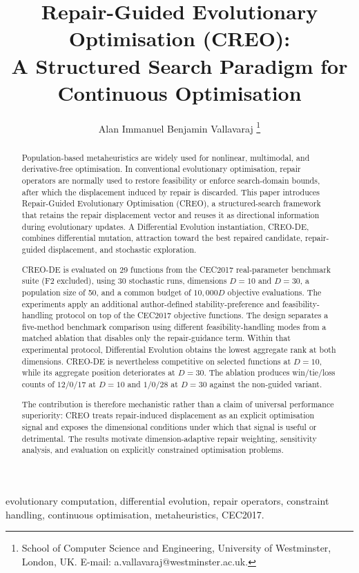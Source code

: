 \documentclass[journal]{IEEEtran}
\title{Repair-Guided Evolutionary Optimisation (CREO):\\
A Structured Search Paradigm for Continuous Optimisation}
\author{Alan Immanuel Benjamin Vallavaraj%
\thanks{School of Computer Science and Engineering, University of Westminster, London, UK.
E-mail: a.vallavaraj@westminster.ac.uk.}}
\begin{document}
\maketitle

\begin{abstract}
Population-based metaheuristics are widely used for nonlinear, multimodal, and derivative-free optimisation. In conventional evolutionary optimisation, repair operators are normally used to restore feasibility or enforce search-domain bounds, after which the displacement induced by repair is discarded. This paper introduces Repair-Guided Evolutionary Optimisation (CREO), a structured-search framework that retains the repair displacement vector and reuses it as directional information during evolutionary updates. A Differential Evolution instantiation, CREO-DE, combines differential mutation, attraction toward the best repaired candidate, repair-guided displacement, and stochastic exploration.

CREO-DE is evaluated on 29 functions from the CEC2017 real-parameter benchmark suite (F2 excluded), using 30 stochastic runs, dimensions $D=10$ and $D=30$, a population size of 50, and a common budget of $10{,}000D$ objective evaluations. The experiments apply an additional author-defined stability-preference and feasibility-handling protocol on top of the CEC2017 objective functions. The design separates a five-method benchmark comparison using different feasibility-handling modes from a matched ablation that disables only the repair-guidance term. Within that experimental protocol, Differential Evolution obtains the lowest aggregate rank at both dimensions. CREO-DE is nevertheless competitive on selected functions at $D=10$, while its aggregate position deteriorates at $D=30$. The ablation produces win/tie/loss counts of $12/0/17$ at $D=10$ and $1/0/28$ at $D=30$ against the non-guided variant.

The contribution is therefore mechanistic rather than a claim of universal performance superiority: CREO treats repair-induced displacement as an explicit optimisation signal and exposes the dimensional conditions under which that signal is useful or detrimental. The results motivate dimension-adaptive repair weighting, sensitivity analysis, and evaluation on explicitly constrained optimisation problems.
\end{abstract}

\begin{IEEEkeywords}
evolutionary computation, differential evolution, repair operators, constraint handling, continuous optimisation, metaheuristics, CEC2017.
\end{IEEEkeywords}
\end{document}
